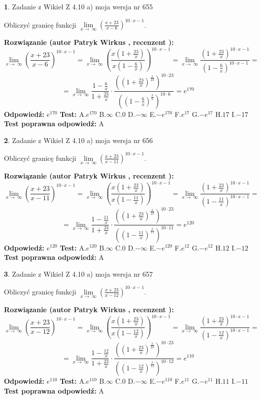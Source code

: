 \documentclass[12pt, a4paper]{article}
\theoremstyle{definition} %
\newtheorem{zad}{}
\newcommand{\zadStart}[1]{\begin{zad}#1\newline}
\newcommand{\zadStop}{\end{zad}}
\newcommand{\rozwStart}[2]{\noindent \textbf{Rozwiązanie (autor #1 , recenzent #2): }\newline}
\newcommand{\rozwStop}{\newline}
\newcommand{\odpStart}{\noindent \textbf{Odpowiedź:}\newline}
\newcommand{\odpStop}{\newline}
\newcommand{\testStart}{\noindent \textbf{Test:}\newline}
\newcommand{\testStop}{\newline}
\newcommand{\kluczStart}{\noindent \textbf{Test poprawna odpowiedź:}\newline}
\newcommand{\kluczStop}{\newline}
\begin{document}
\zadStart{Zadanie z Wikieł Z 4.10 a) moja wersja nr 655}

Obliczyć granicę funkcji  $\lim\limits_{x\to\ \infty}(\frac{x+23}{x-6})^{10\cdot x-1}$.
\zadStop
\rozwStart{Patryk Wirkus}{}
$$\lim\limits_{x\to\ \infty}(\frac{x+23}{x-6})^{10\cdot x-1} = \lim\limits_{x\to\ \infty}(\frac{x(1+\frac{23}{x})}{x(1-\frac{6}{x})})^{10\cdot x-1}=\lim\limits_{x\to\ \infty}\frac{(1+\frac{23}{x})^{10\cdot x-1}}{(1-\frac{6}{x})^{10\cdot x-1}}=$$
$$=\lim\limits_{x\to\ \infty}\frac{1-\frac{6}{x}}{1+\frac{23}{x}}\cdot\frac{((1+\frac{23}{x})^{\frac{x}{23}})^{10\cdot23}}{((1-\frac{6}{x})^{\frac{x}{6}})^{10\cdot6}}=e^{170}$$
\rozwStop
\odpStart
$e^{170}$
\odpStop
\testStart
A.$e^{170}$ B.$\infty$ C.$0$ D.$-\infty$ E.$-e^{170}$
F.$e^{17}$ G.$-e^{17}$
H.$17$
I.$-17$
\testStop
\kluczStart
A
\kluczStop



\zadStart{Zadanie z Wikieł Z 4.10 a) moja wersja nr 656}

Obliczyć granicę funkcji  $\lim\limits_{x\to\ \infty}(\frac{x+23}{x-11})^{10\cdot x-1}$.
\zadStop
\rozwStart{Patryk Wirkus}{}
$$\lim\limits_{x\to\ \infty}(\frac{x+23}{x-11})^{10\cdot x-1} = \lim\limits_{x\to\ \infty}(\frac{x(1+\frac{23}{x})}{x(1-\frac{11}{x})})^{10\cdot x-1}=\lim\limits_{x\to\ \infty}\frac{(1+\frac{23}{x})^{10\cdot x-1}}{(1-\frac{11}{x})^{10\cdot x-1}}=$$
$$=\lim\limits_{x\to\ \infty}\frac{1-\frac{11}{x}}{1+\frac{23}{x}}\cdot\frac{((1+\frac{23}{x})^{\frac{x}{23}})^{10\cdot23}}{((1-\frac{11}{x})^{\frac{x}{11}})^{10\cdot11}}=e^{120}$$
\rozwStop
\odpStart
$e^{120}$
\odpStop
\testStart
A.$e^{120}$ B.$\infty$ C.$0$ D.$-\infty$ E.$-e^{120}$
F.$e^{12}$ G.$-e^{12}$
H.$12$
I.$-12$
\testStop
\kluczStart
A
\kluczStop



\zadStart{Zadanie z Wikieł Z 4.10 a) moja wersja nr 657}

Obliczyć granicę funkcji  $\lim\limits_{x\to\ \infty}(\frac{x+23}{x-12})^{10\cdot x-1}$.
\zadStop
\rozwStart{Patryk Wirkus}{}
$$\lim\limits_{x\to\ \infty}(\frac{x+23}{x-12})^{10\cdot x-1} = \lim\limits_{x\to\ \infty}(\frac{x(1+\frac{23}{x})}{x(1-\frac{12}{x})})^{10\cdot x-1}=\lim\limits_{x\to\ \infty}\frac{(1+\frac{23}{x})^{10\cdot x-1}}{(1-\frac{12}{x})^{10\cdot x-1}}=$$
$$=\lim\limits_{x\to\ \infty}\frac{1-\frac{12}{x}}{1+\frac{23}{x}}\cdot\frac{((1+\frac{23}{x})^{\frac{x}{23}})^{10\cdot23}}{((1-\frac{12}{x})^{\frac{x}{12}})^{10\cdot12}}=e^{110}$$
\rozwStop
\odpStart
$e^{110}$
\odpStop
\testStart
A.$e^{110}$ B.$\infty$ C.$0$ D.$-\infty$ E.$-e^{110}$
F.$e^{11}$ G.$-e^{11}$
H.$11$
I.$-11$
\testStop
\kluczStart
A
\kluczStop
\end{document}
